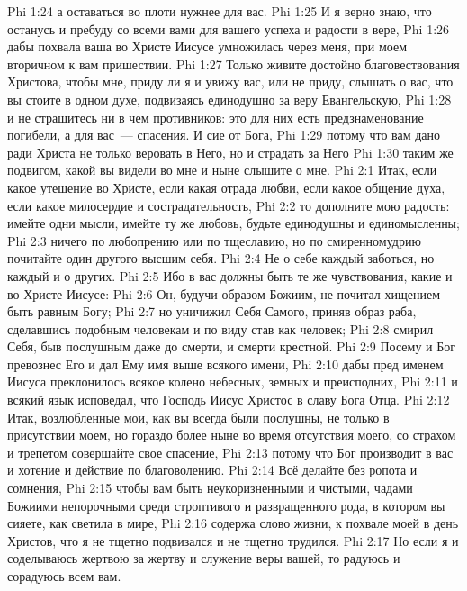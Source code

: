 \vs Phi 1:24 а оставаться во плоти нужнее для вас.
\vs Phi 1:25 И я верно знаю, что останусь и пребуду со всеми вами для вашего успеха и радости в вере,
\vs Phi 1:26 дабы похвала ваша во Христе Иисусе умножилась через меня, при моем вторичном к вам пришествии.
\vs Phi 1:27 Только живите достойно благовествования Христова, чтобы мне, приду ли я и увижу вас, или не приду, слышать о вас, что вы стоите в одном духе, подвизаясь единодушно за веру Евангельскую,
\vs Phi 1:28 и не страшитесь ни в чем противников: это для них есть предзнаменование погибели, а для вас~--- спасения. И сие от Бога,
\vs Phi 1:29 потому что вам дано ради Христа не только веровать в Него, но и страдать за Него
\vs Phi 1:30 таким же подвигом, какой вы видели во мне и ныне слышите о мне.
\vs Phi 2:1 Итак, если  какое утешение во Христе, если  какая отрада любви, если  какое общение духа, если  какое милосердие и сострадательность,
\vs Phi 2:2 то дополните мою радость: имейте одни мысли, имейте ту же любовь, будьте единодушны и единомысленны;
\vs Phi 2:3 ничего  по любопрению или по тщеславию, но по смиренномудрию почитайте один другого высшим себя.
\vs Phi 2:4 Не о себе  каждый заботься, но каждый и о других.
\vs Phi 2:5 Ибо в вас должны быть те же чувствования, какие и во Христе Иисусе:
\vs Phi 2:6 Он, будучи образом Божиим, не почитал хищением быть равным Богу;
\vs Phi 2:7 но уничижил Себя Самого, приняв образ раба, сделавшись подобным человекам и по виду став как человек;
\vs Phi 2:8 смирил Себя, быв послушным даже до смерти, и смерти крестной.
\vs Phi 2:9 Посему и Бог превознес Его и дал Ему имя выше всякого имени,
\vs Phi 2:10 дабы пред именем Иисуса преклонилось всякое колено небесных, земных и преисподних,
\vs Phi 2:11 и всякий язык исповедал, что Господь Иисус Христос в славу Бога Отца.
\rsbpar\vs Phi 2:12 Итак, возлюбленные мои, как вы всегда были послушны, не только в присутствии моем, но гораздо более ныне во время отсутствия моего, со страхом и трепетом совершайте свое спасение,
\vs Phi 2:13 потому что Бог производит в вас и хотение и действие по  благоволению.
\vs Phi 2:14 Всё делайте без ропота и сомнения,
\vs Phi 2:15 чтобы вам быть неукоризненными и чистыми, чадами Божиими непорочными среди строптивого и развращенного рода, в котором вы сияете, как светила в мире,
\vs Phi 2:16 содержа слово жизни, к похвале моей в день Христов, что я не тщетно подвизался и не тщетно трудился.
\vs Phi 2:17 Но если я и соделываюсь жертвою за жертву и служение веры вашей, то радуюсь и сорадуюсь всем вам.
